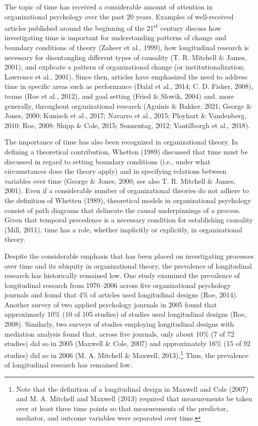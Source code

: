 \documentclass[
  english,
  man,floatsintext]{apa7}
\begin{document}
The topic of time has received a considerable amount of
attention in organizational psychology over the past 20 years. Examples
of well-received articles published around the beginning of the 21\textsuperscript{st}
century discuss how investigating time is important for
understanding patterns of change and boundary conditions of theory
(Zaheer et al., 1999), how longitudinal research is necessary for disentangling
different types of causality (T. R. Mitchell \& James, 2001), and explicate a pattern
of organizational change (or institutionalization; Lawrence et al., 2001).
Since then, articles have emphasized the need to address time in
specific areas such as performance (Dalal et al., 2014; C. D. Fisher, 2008), teams (Roe et al., 2012), and goal setting (Fried \& Slowik, 2004) and, more generally, throughout organizational research (Aguinis \& Bakker, 2021; George \& Jones, 2000; Kunisch et al., 2017; Navarro et al., 2015; Ployhart \& Vandenberg, 2010; Roe, 2008; Shipp \& Cole, 2015; Sonnentag, 2012; Vantilborgh et al., 2018).

The importance of time has also been recognized in organizational theory. In defining a theoretical contribution, Whetten (1989) discussed that time must be discussed in regard to setting boundary conditions (i.e., under what circumstances does the theory apply) and in specifying relations between variables over time (George \& Jones, 2000; see also T. R. Mitchell \& James, 2001). Even if a considerable number of organizational theories do not adhere to the definition of Whetten (1989), theoretical models in organizational psychology consist of path diagrams that delineate the causal underpinnings of a process. Given that temporal precedence is a necessary condition for establishing causality (Mill, 2011), time has a role, whether implicitly or explicitly, in organizational theory.





Despite the considerable emphasis that has been placed on investigating processes over time and its ubiquity in organizational theory, the prevalence of longitudinal research has historically remained low. One study examined the prevalence of longitudinal research from 1970--2006 across five organizational psychology journals and found that 4\% of articles used longitudinal designs (Roe, 2014). Another survey of two applied psychology journals in 2005 found that approximaely 10\% (10 of 105 studies) of studies used longitudinal designs (Roe, 2008). Similarly, two surveys of studies employing longitudinal designs with mediation analysis found that, across five journals, only about 10\% (7 of 72 studies) did so in 2005 (Maxwell \& Cole, 2007) and approximately 16\% (15 of 92 studies) did so in 2006 (M. A. Mitchell \& Maxwell, 2013).\footnote{Note that the definition of a longitudinal design in Maxwell and Cole (2007) and M. A. Mitchell and Maxwell (2013) required that measurements be taken over at least three time points so that measurements of the predictor, mediator, and outcome variables were separated over time.} Thus, the prevalence of longitudinal research has remained low.
\end{document}
